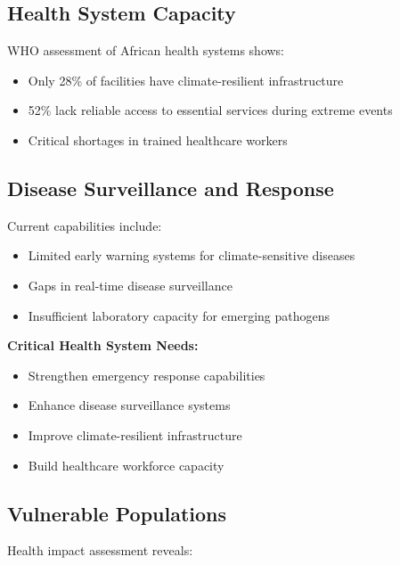 \subsection{Health System Capacity}
WHO assessment of African health systems shows:

\begin{itemize}
    \item Only 28\% of facilities have climate-resilient infrastructure
    \item 52\% lack reliable access to essential services during extreme events
    \item Critical shortages in trained healthcare workers
\end{itemize}

\subsection{Disease Surveillance and Response}
Current capabilities include:

\begin{itemize}
    \item Limited early warning systems for climate-sensitive diseases
    \item Gaps in real-time disease surveillance
    \item Insufficient laboratory capacity for emerging pathogens
\end{itemize}

\begin{keymessage}
\textbf{Critical Health System Needs:}
\begin{itemize}
    \item Strengthen emergency response capabilities
    \item Enhance disease surveillance systems
    \item Improve climate-resilient infrastructure
    \item Build healthcare workforce capacity
\end{itemize}
\end{keymessage}

\subsection{Vulnerable Populations}
Health impact assessment reveals:

